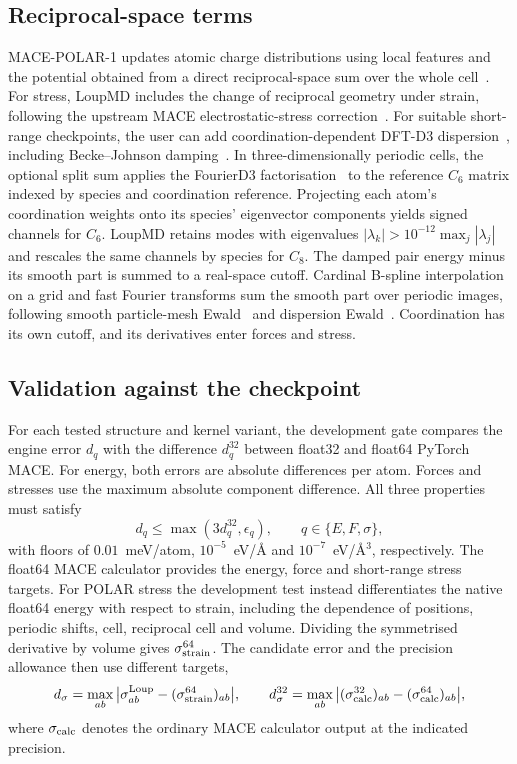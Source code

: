 \subsection{Reciprocal-space terms}
MACE-POLAR-1 updates atomic charge distributions using local features and the potential obtained from a direct reciprocal-space sum over the whole cell~\cite{batatia2026polar}. For stress, LoupMD includes the change of reciprocal geometry under strain, following the upstream MACE electrostatic-stress correction~\cite{baldwin2026polarstress}. For suitable short-range checkpoints, the user can add coordination-dependent DFT-D3 dispersion~\cite{grimme2010d3}, including Becke--Johnson damping~\cite{grimme2011bj}. In three-dimensionally periodic cells, the optional split sum applies the FourierD3 factorisation~\cite[\S\S II.3--II.4]{valeeva2026fourierd3} to the reference $C_6$ matrix indexed by species and coordination reference. Projecting each atom's coordination weights onto its species' eigenvector components yields signed channels for $C_6$. LoupMD retains modes with eigenvalues $|\lambda_k|>10^{-12}\max_j|\lambda_j|$ and rescales the same channels by species for $C_8$. The damped pair energy minus its smooth part is summed to a real-space cutoff. Cardinal B-spline interpolation on a grid and fast Fourier transforms sum the smooth part over periodic images, following smooth particle-mesh Ewald~\cite{essmann1995spme} and dispersion Ewald~\cite{iseleholder2012dispersion}. Coordination has its own cutoff, and its derivatives enter forces and stress.

\subsection{Validation against the checkpoint}
For each tested structure and kernel variant, the development gate compares the engine error $d_q$ with the difference $d_q^{32}$ between float32 and float64 PyTorch MACE. For energy, both errors are absolute differences per atom. Forces and stresses use the maximum absolute component difference. All three properties must satisfy
\begin{equation}
d_q \leq \max(3d_q^{32},\epsilon_q), \qquad q\in\{E,F,\sigma\},
\end{equation}
with floors of $0.01$~meV/atom, $10^{-5}$~eV/\AA{} and $10^{-7}$~eV/\AA$^3$, respectively. The float64 MACE calculator provides the energy, force and short-range stress targets. For POLAR stress the development test instead differentiates the native float64 energy with respect to strain, including the dependence of positions, periodic shifts, cell, reciprocal cell and volume. Dividing the symmetrised derivative by volume gives $\sigma^{64}_{\rm strain}$. The candidate error and the precision allowance then use different targets,
\[
 d_\sigma=\max_{ab}\big|\sigma^{\rm Loup}_{ab}-(\sigma^{64}_{\rm strain})_{ab}\big|,\qquad
 d_\sigma^{32}=\max_{ab}\big|(\sigma^{32}_{\rm calc})_{ab}-(\sigma^{64}_{\rm calc})_{ab}\big|,
\]
where $\sigma_{\rm calc}$ denotes the ordinary MACE calculator output at the indicated precision.

